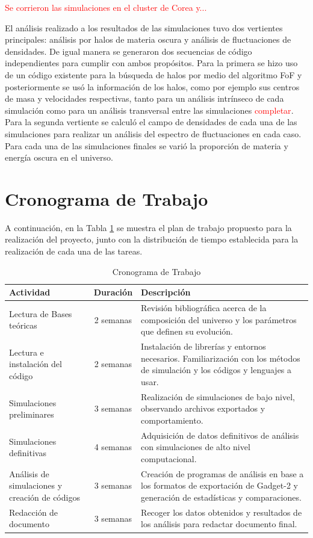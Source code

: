 \textcolor{red}{Se corrieron las simulaciones en el cluster de Corea y...}

El análisis realizado a los resultados de las simulaciones tuvo dos vertientes principales: análisis por halos de materia oscura y análisis de fluctuaciones de densidades. De igual manera se generaron dos secuencias de código independientes para cumplir con ambos propósitos. Para la primera se hizo uso de un código existente para la búsqueda de halos por medio del algoritmo FoF y posteriormente se usó la información de los halos, como por ejemplo sus centros de masa y velocidades respectivas, tanto para un análisis intrínseco de cada simulación como para un análisis transversal entre las simulaciones \textcolor{red}{completar}. Para la segunda vertiente se calculó el campo de densidades de cada una de las simulaciones para realizar un análisis del espectro de fluctuaciones en cada caso. Para cada una de las simulaciones finales se varió la proporción de materia y energía oscura en el universo.

\section{Cronograma de Trabajo}
A continuación, en la Tabla \ref{tab:crono} se muestra el plan de trabajo propuesto para la realización del proyecto, junto con la distribución de tiempo establecida para la realización de cada una de las tareas.

\begin{table}[H]
	\centering
	\begin{tabular}{>{\centering}p{5cm}cp{7.5cm}}
		\hline \hline
		\textbf{Actividad} & \textbf{Duración} & \textbf{Descripción} \\
		\hline
		Lectura de Bases teóricas & 2 semanas & Revisión bibliográfica acerca de la composición del universo y los parámetros que definen su evolución.\\
		Lectura e instalación del código & 2 semanas & Instalación de librerías y entornos necesarios. Familiarización con los métodos de simulación y los códigos y lenguajes a usar.\\
		Simulaciones preliminares & 3 semanas & Realización de simulaciones de bajo nivel, observando archivos exportados y comportamiento.\\
		Simulaciones definitivas & 4 semanas & Adquisición de datos definitivos de análisis con simulaciones de alto nivel computacional.\\
		Análisis de simulaciones y creación de códigos& 3 semanas & Creación de programas de análisis en base a los formatos de exportación de Gadget-2 y generación de estadísticas y comparaciones.\\
		Redacción de documento & 3 semanas & Recoger los datos obtenidos y resultados de los análisis para redactar documento final.\\		
		\hline
	\end{tabular}
	\caption[Cronograma de Trabajo]{Cronograma de Trabajo \footnotemark}
	\label{tab:crono}
\end{table}




